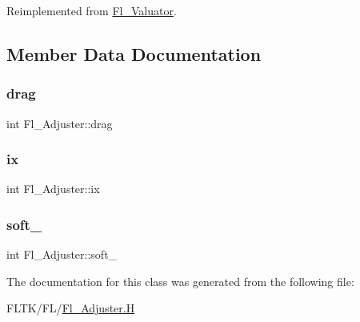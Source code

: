 Reimplemented from \hyperlink{class_fl___valuator_ae1c1be13fd238d3444c7a02421fae5c6}{Fl\+\_\+\+Valuator}.



\subsection{Member Data Documentation}
\mbox{\label{class_fl___adjuster_aa070e4554dba946bde50685d4a3ad49d}} 
\subsubsection{\texorpdfstring{drag}{drag}}
{\footnotesize\ttfamily int Fl\+\_\+\+Adjuster\+::drag\hspace{0.3cm}{\ttfamily [private]}}

\mbox{\label{class_fl___adjuster_a6c120b2504570945b4683249af6ac748}} 
\subsubsection{\texorpdfstring{ix}{ix}}
{\footnotesize\ttfamily int Fl\+\_\+\+Adjuster\+::ix\hspace{0.3cm}{\ttfamily [private]}}

\mbox{\label{class_fl___adjuster_a42c38a6d83885056757bb08fcb211407}} 
\subsubsection{\texorpdfstring{soft\+\_\+}{soft\_}}
{\footnotesize\ttfamily int Fl\+\_\+\+Adjuster\+::soft\+\_\+\hspace{0.3cm}{\ttfamily [private]}}



The documentation for this class was generated from the following file\+:\begin{DoxyCompactItemize}
\item 
F\+L\+T\+K/\+F\+L/\hyperlink{_fl___adjuster_8_h}{Fl\+\_\+\+Adjuster.\+H}\end{DoxyCompactItemize}
